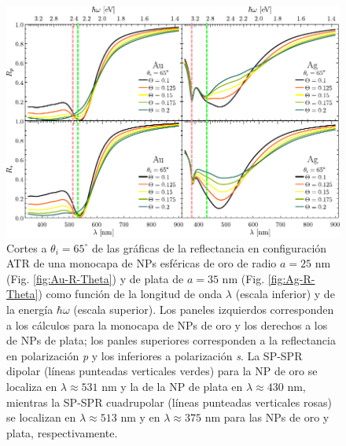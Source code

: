 \begin{figure}[h!]\centering
	\includegraphics[scale=1]{2-Resultados/figs/6-AuThetaVar/0-cut65_Au_Aug.pdf}\vspace*{-.5em}
	\caption{Cortes a $\theta_i = 65^\circ$ de las gráficas de  la reflectancia  en configuración ATR  de una monocapa de NPs esféricas de oro de radio $a=25$ nm (Fig. \ref{fig:Au-R-Theta}) y de plata de $a=35$ nm (Fig. \ref{fig:Ag-R-Theta}) como función de la longitud de onda $\lambda$ (escala inferior) y de la energía $\hbar\omega$ (escala superior). Los paneles izquierdos corresponden a los cálculos para la monocapa de NPs de oro y los derechos a los de NPs de plata; los panles superiores corresponden a la reflectancia en polarización \emph{p} y los inferiores a polarización \emph{s}. La SP-SPR dipolar (líneas punteadas verticales verdes) para la NP de oro se localiza en  $\lambda \approx 531$ nm y la de la NP de plata en $\lambda\approx430$ nm, mientras la SP-SPR cuadrupolar (líneas punteadas verticales rosas) se localizan en $\lambda\approx513$ nm y en $\lambda\approx375$ nm para las NPs de oro y plata, respectivamente. }\label{fig:AuAg-Cuts-65}
	\end{figure}	
	
